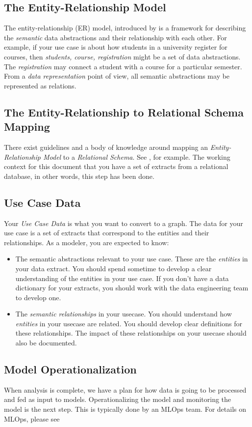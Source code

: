 \documentclass{article}
\begin{document}
\subsection*{The Entity-Relationship Model}
The entity-relationship (ER) model, introduced by \cite{chen1976entity} is a framework for describing the \emph{semantic} data abstractions and their relationship with each other. For example, if your use case is about how students in a university register for courses, then \emph{students, course, registration} might be a set of data abstractions. The \emph{registration} may connect a student with a course for a particular semester. From a \emph{data representation} point of view, all semantic abstractions may be represented as relations.

\subsection*{The Entity-Relationship to Relational Schema Mapping}\label{sec: er to rel}
There exist guidelines and a body of knowledge around mapping an \emph{Entity-Relationship Model} to a \emph{Relational Schema}. See \cite{elmasri2016fundamentals}, for example. The working context for this document that you have a set of extracts from a relational database, in other words, this step has been done.

\subsection*{Use Case Data}
Your \emph{Use Case Data} is what you want to convert to a graph. The data for your use case is a set of extracts that correspond to the entities and their relationships. As a modeler, you are expected to know:
\begin{itemize}
    \item  The semantic abstractions relevant to your use case. These are the \emph{entities} in your data extract. You should spend sometime to develop a clear understanding of the entities in your use case. If you don't have a data dictionary for your extracts, you should work with the data engineering team to develop one.
    \item The \emph{semantic relationships} in your usecase. You should understand how \emph{entities} in your usecase are related. You should develop clear definitions for these relationships. The impact of these relationships on your usecase should also be documented.
    
\end{itemize}


\subsection*{Model Operationalization}
When analysis is complete, we have a plan for how data is going to be processed and fed as input to models.  Operationalizing the model and monitoring the model is the next step. This is typically done by an MLOps team. For details on MLOps, please see \cite{mlopsMlopsorg}
\end{document}
